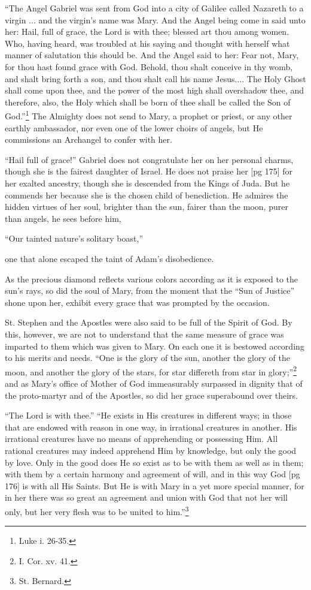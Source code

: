 “The Angel Gabriel was sent from God into a
city of Galilee called Nazareth to a virgin ... and
the virgin's name was Mary. And the Angel being
come in said unto her: Hail, full of grace, the Lord
is with thee; blessed art thou among women. Who,
having heard, was troubled at his saying and
thought with herself what manner of salutation
this should be. And the Angel said to her: Fear
not, Mary, for thou hast found grace with God.
Behold, thou shalt conceive in thy womb, and shalt
bring forth a son, and thou shalt call his name
Jesus.... The Holy Ghost shall come upon thee,
and the power of the most high shall overshadow
thee, and therefore, also, the Holy which shall be
born of thee shall be called the Son of
God.”\footnote{Luke i. 26-35.} The
Almighty does not send to Mary, a prophet or
priest, or any other earthly ambassador, nor even
one of the lower choirs of angels, but He commissions
an Archangel to confer with her.

“Hail full of grace!” Gabriel does not congratulate
her on her personal charms, though she is the
fairest daughter of Israel. He does not praise her
[pg 175]
for her exalted ancestry, though she is descended
from the Kings of Juda. But he commends her
because she is the chosen child of benediction. He
admires the hidden virtues of her soul, brighter
than the sun, fairer than the moon, purer than
angels, he sees before him,

“Our tainted nature's solitary boast,”

one that alone escaped the taint of Adam's disobedience.

As the precious diamond reflects various colors
according as it is exposed to the sun's rays, so did
the soul of Mary, from the moment that the “Sun
of Justice” shone upon her, exhibit every grace
that was prompted by the occasion.

St. Stephen and the Apostles were also said to
be full of the Spirit of God. By this, however, we
are not to understand that the same measure of
grace was imparted to them which was given to
Mary. On each one it is bestowed according to his
merits and needs. “One is the glory of the sun,
another the glory of the moon, and another the
glory of the stars, for star differeth from star in
glory;”\footnote{I. Cor. xv.
41.} and as Mary's office of Mother of God
immeasurably surpassed in dignity that of the
proto-martyr and of the Apostles, so did her grace
superabound over theirs.

“The Lord is with thee.” “He exists in His
creatures in different ways; in those that are endowed
with reason in one way, in irrational creatures
in another. His irrational creatures have no
means of apprehending or possessing Him. All
rational creatures may indeed apprehend Him
by knowledge, but only the good by love. Only
in the good does He so exist as to be with them
as well as in them; with them by a certain harmony
and agreement of will, and in this way God
[pg 176]
is with all His Saints. But He is with Mary in
a yet more special manner, for in her there was so
great an agreement and union with God that not
her will only, but her very flesh was to be united to
him.”\footnote{St. Bernard.}

